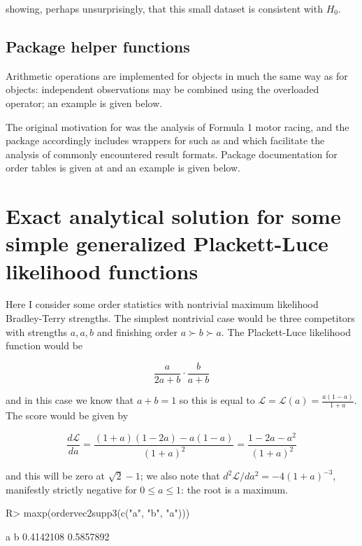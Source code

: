 \documentclass[article]{jss}
\begin{document}
showing, perhaps unsurprisingly, that this small dataset is consistent
with $H_0$. 

\subsection{Package helper functions}

Arithmetic operations are implemented for  objects in
much the same way as for  objects: independent
observations may be combined using the overloaded \code{+} operator;
an example is given below.

The original motivation for  was the analysis of Formula
1 motor racing, and the package accordingly includes wrappers for
 such as  and
 which facilitate the analysis of commonly
encountered result formats.  Package documentation for order tables is
given at  and an example is given below.

\section{Exact analytical solution for some simple generalized
Plackett-Luce likelihood functions}

Here I consider some order statistics with nontrivial maximum
likelihood Bradley-Terry strengths.  The simplest nontrivial case
would be three competitors with strengths $a,a,b$ and finishing order
$a\succ b\succ a$.  The Plackett-Luce likelihood function would be

\begin{equation}\label{aba}
\frac{a}{2a+b}\cdot\frac{b}{a+b}
\end{equation}

and in this case we know that $a+b=1$ so this is equal to
$\mathcal{L}=\mathcal{L}(a)=\frac{a(1-a)}{1+a}$.  The score would be
given by

\begin{equation}\label{aba_mle}
\frac{d\mathcal{L}}{da}=\frac{(1+a)(1-2a)-a(1-a)}{(1+a)^2}=
\frac{1-2a-a^2}{(1+a)^2}
\end{equation}

and this will be zero at $\sqrt{2}-1$; we also note that
$d^2\mathcal{L}/da^2=-4(1+a)^{-3}$, manifestly strictly negative for
$0\leq a\leq 1$: the root is a maximum.


\begin{Schunk}
\begin{Sinput}
R> maxp(ordervec2supp3(c("a", "b", "a")))
\end{Sinput}
\begin{Soutput}
        a         b 
0.4142108 0.5857892 
\end{Soutput}
\end{Schunk}
\end{document}

